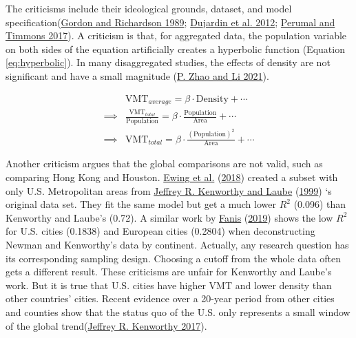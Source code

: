 \documentclass[
  11pt,
  openany]{memoir}
\begin{document}
The criticisms include their ideological grounds, dataset, and model specification(\protect\hyperlink{ref-gordonGasolineConsumptionCities1989}{Gordon and Richardson 1989}; \protect\hyperlink{ref-dujardinHometoworkCommutingUrban2012}{Dujardin et al. 2012}; \protect\hyperlink{ref-perumalContextualDensityUS2017}{Perumal and Timmons 2017}). A criticism is that, for aggregated data, the population variable on both sides of the equation artificially creates a hyperbolic function (Equation \eqref{eq:hyperbolic}). In many disaggregated studies, the effects of density are not significant and have a small magnitude (\protect\hyperlink{ref-zhaoRethinkingDeterminantsVehicle2021}{P. Zhao and Li 2021}).

\begin{equation}
\begin{split}
 & \text{VMT}_{average}  =\beta\cdot  \text{Density}  +\cdots\\ 
\implies & \frac{\text{VMT}_{total}}{\text{Population}}  = \beta\cdot  \frac{\text{Population}}{\text{Area}}  +\cdots\\
\implies & \text{VMT}_{total} = \beta\cdot  \frac{(\text{Population})^2}{\text{Area}}  +\cdots
\end{split}
\label{eq:hyperbolic}
\end{equation}

Another criticism argues that the global comparisons are not valid, such as comparing Hong Kong and Houston. \protect\hyperlink{ref-ewingTestingNewmanKenworthy2018}{Ewing et al.} (\protect\hyperlink{ref-ewingTestingNewmanKenworthy2018}{2018}) created a subset with only U.S. Metropolitan areas from \protect\hyperlink{ref-kenworthyPatternsAutomobileDependence1999}{Jeffrey R. Kenworthy and Laube} (\protect\hyperlink{ref-kenworthyPatternsAutomobileDependence1999}{1999}) `s original data set. They fit the same model but get a much lower \(R^2\) (0.096) than Kenworthy and Laube's (0.72). A similar work by \protect\hyperlink{ref-fanisThreeStudiesThat2019}{Fanis} (\protect\hyperlink{ref-fanisThreeStudiesThat2019}{2019}) shows the low \(R^2\) for U.S. cities (0.1838) and European cities (0.2804) when deconstructing Newman and Kenworthy's data by continent. Actually, any research question has its corresponding sampling design. Choosing a cutoff from the whole data often gets a different result. These criticisms are unfair for Kenworthy and Laube's work. But it is true that U.S. cities have higher VMT and lower density than other countries' cities. Recent evidence over a 20-year period from other cities and counties show that the status quo of the U.S. only represents a small window of the global trend(\protect\hyperlink{ref-kenworthyAutomobileDependenceEmerging2017}{Jeffrey R. Kenworthy 2017}).
\end{document}
